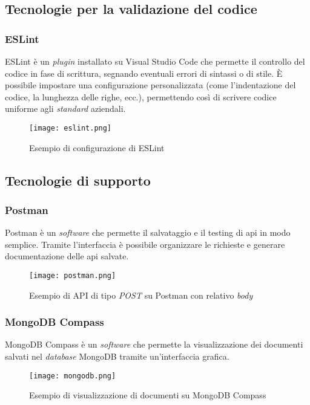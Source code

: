 \subsection{Tecnologie per la validazione del codice}
\subsubsection{ESLint}
ESLint è un \textit{plugin} installato su Visual Studio Code che permette il controllo del codice in fase di scrittura, segnando eventuali errori di sintassi o di stile.
È possibile impostare una configurazione personalizzata (come l'indentazione del codice, la lunghezza delle righe, ecc.), permettendo così di scrivere codice uniforme agli \textit{standard} aziendali.
\begin{figure}[H]
    \centering
    \texttt{[image: eslint.png]}
    \caption{Esempio di configurazione di ESLint}
    \label{fig:ESlint}
\end{figure} 
\subsection{Tecnologie di supporto}
\subsubsection{Postman}
Postman è un \textit{software} che permette il salvataggio e il testing di \gls{api} in modo semplice. Tramite l'interfaccia è possibile organizzare le richieste e generare documentazione delle \gls{api} salvate.
\begin{figure}[H]
    \centering
    \texttt{[image: postman.png]}
    \caption{Esempio di API di tipo \textit{POST} su Postman con relativo \textit{body}}
    \label{fig:Postman}
\end{figure} 



\subsubsection{MongoDB Compass}
MongoDB Compass è un \textit{software} che permette la visualizzazione dei documenti salvati nel \textit{database} MongoDB tramite un'interfaccia grafica.
\begin{figure}[H]
    \centering
    \texttt{[image: mongodb.png]}
    \caption{Esempio di visualizzazione di documenti su MongoDB Compass}
    \label{fig:MongoDB}
\end{figure} 


